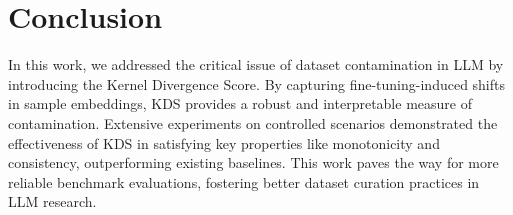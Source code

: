 \section{Conclusion}
In this work, we addressed the critical issue of dataset contamination in LLM  by introducing the Kernel Divergence Score. By capturing fine-tuning-induced shifts in sample embeddings, KDS provides a robust and interpretable measure of contamination. Extensive experiments on controlled scenarios demonstrated the effectiveness of KDS in satisfying key properties like monotonicity and consistency, outperforming existing baselines. This work paves the way for more reliable benchmark evaluations, fostering better dataset curation practices in LLM research.



